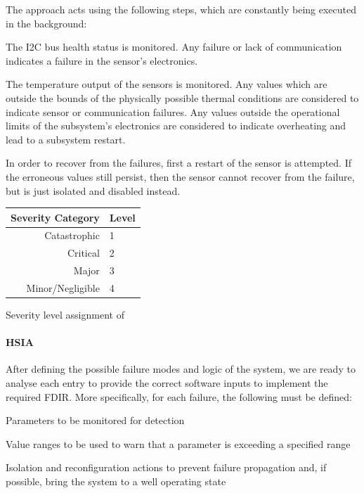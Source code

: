 \documentclass[a4paper,nobib]{tufte-book}
\begin{document}
The approach acts using the following steps, which are constantly being executed in the background:
\begin{compactenum}
	\item The \ac{I2C} bus health status is monitored. Any failure or lack of communication indicates a failure in the sensor's electronics.
	\item The temperature output of the sensors is monitored. Any values which are outside the bounds of the physically possible thermal conditions are considered to indicate sensor or communication failures. Any values outside the operational limits of the subsystem's electronics are considered to indicate overheating and lead to a subsystem restart.
	\item In order to recover from the failures, first a restart of the sensor is attempted. If the erroneous values still persist, then the sensor cannot recover from the failure, but is just isolated and disabled instead.
\end{compactenum}

\begin{margintable}
	\begin{tabularx}{\linewidth}{@{}rX@{}}
		\toprule
		Severity Category & Level\\ \midrule
		Catastrophic & 1 \\
		Critical & 2 \\
		Major & 3 \\
		Minor/Negligible & 4 \\ \bottomrule
	\end{tabularx}
	\caption{Severity level assignment of }
\end{margintable}

\clearpage
\paragraph{\acl{HSIA}}

After defining the possible failure modes and logic of the system, we are ready to analyse each entry to provide the correct software inputs to implement the required \ac{FDIR}. More specifically, for each failure, the following must be defined: \autocite[84]{SAVOIR-HB-003}
\begin{compactitem}
	\item Parameters to be monitored for detection
	\item Value ranges to be used to warn that a parameter is exceeding a specified range
	\item Isolation and reconfiguration actions to prevent failure propagation and, if possible, bring the system to a well operating state
\end{compactitem}
\end{document}
